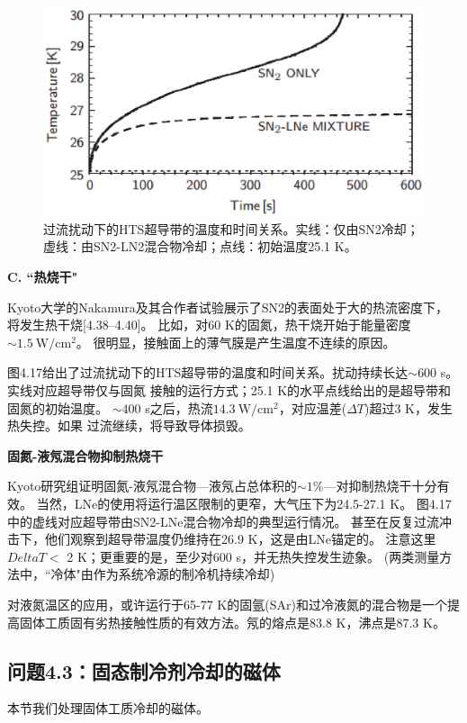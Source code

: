 \begin{figure}[htbp]
	\centering
	\includegraphics[scale=0.7]{chpt4/figs/fig4.17.eps}
	\caption{过流扰动下的HTS超导带的温度和时间关系。实线：仅由SN2冷却；虚线：由SN2-LN2混合物冷却；点线：初始温度25.1 K。}
\end{figure}


\textbf{C. ``热烧干"}

Kyoto大学的Nakamura及其合作者试验展示了SN2的表面处于大的热流密度下，将发生热干烧[4.38–4.40]。
比如，对60 K的固氮，热干烧开始于能量密度$\sim 1.5\ \mathrm{W/cm^2}$。
很明显，接触面上的薄气膜是产生温度不连续的原因。

图4.17给出了过流扰动下的HTS超导带的温度和时间关系。扰动持续长达$\sim 600$ s。实线对应超导带仅与固氮
接触的运行方式；25.1 K的水平点线给出的是超导带和固氮的初始温度。
$\sim 400$ s之后，热流$14.3\ \mathrm{W/cm^2}$，对应温差($\Delta T$)超过3 K，发生热失控。如果
过流继续，将导致导体损毁。

\textbf{固氮-液氖混合物抑制热烧干}

Kyoto研究组证明固氮-液氖混合物---液氖占总体积的$\sim 1\%$---对抑制热烧干十分有效。
当然，LNe的使用将运行温区限制的更窄，大气压下为24.5-27.1 K。
图4.17中的虚线对应超导带由SN2-LNe混合物冷却的典型运行情况。
甚至在反复过流冲击下，他们观察到超导带温度仍维持在26.9 K，这是由LNe锚定的。
注意这里$Delta T<$ 2 K；更重要的是，至少对600 s，并无热失控发生迹象。
(两类测量方法中，``冷体"由作为系统冷源的制冷机持续冷却)

对液氮温区的应用，或许运行于65-77 K的固氩(SAr)和过冷液氮的混合物是一个提高固体工质固有劣热接触性质的有效方法。氖的熔点是83.8 K，沸点是87.3 K。



\subsection{问题4.3：固态制冷剂冷却的磁体}
本节我们处理固体工质冷却的磁体。

